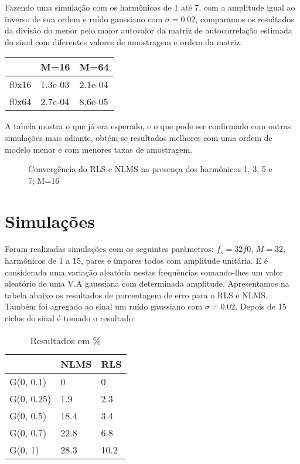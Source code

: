 Fazendo uma simulação com os harmônicos de 1 até 7, com a amplitude igual ao inverso de sua ordem e ruído gaussiano com $\sigma=0.02$, comparamos os resultados da divisão do menor pelo maior autovalor da matriz de autocorrelação estimada do sinal com diferentes valores de amostragem e ordem da matriz:

\begin{table}[H]
	\centering
	\begin{tabular}{l|l|l}
		   & M=16 & M=64 \\
		\hline 
		f0x16      & 1.3e-03 & 2.1e-04 \\
		f0x64      & 2.7e-04  & 8.6e-05       
	\end{tabular}
\end{table}

A tabela mostra o que já era esperado, e o que pode ser confirmado com outras simulações mais adiante, obtém-se resultados melhores com uma ordem de modelo menor e com menores taxas de amostragem.

\begin{figure}[h]
	\centering    
	\def\svgwidth{\columnwidth}
	
	\caption{Convergência do RLS e NLMS na presença dos harmônicos 1, 3, 5 e 7; M=16}
	\label{fig:your image label}
\end{figure}

\section{Simulações}

\indent Foram realizadas simulações com os seguintes parâmetros: $f_s=32f0$, $M=32$, harmônicos de 1 a 15, pares e ímpares todos com amplitude unitária. E é considerada uma variação aleatória nestas frequências somando-lhes um valor aleatório de uma V.A gaussiana com determinada amplitude. Apresentamos na tabela abaixo os resultados de porcentagem de erro para o RLS e NLMS. Também foi agregado ao sinal um ruído gaussiano com $\sigma=0.02$. Depois de 15 ciclos do sinal é tomado o resultado:

\begin{table}[H]
	\centering
	\begin{tabular}{l|l|l}
	              & NLMS & RLS \\
		\hline 
		G(0, 0.1)  & 0     & 0 \\
		G(0, 0.25) & 1.9   & 2.3  \\
		G(0, 0.5)  & 18.4  & 3.4  \\
		G(0, 0.7)  & 22.8  & 6.8  \\
		G(0, 1)    & 28.3  & 10.2 \\ 
	\end{tabular}
	\caption{Resultados em \%}
\end{table}

